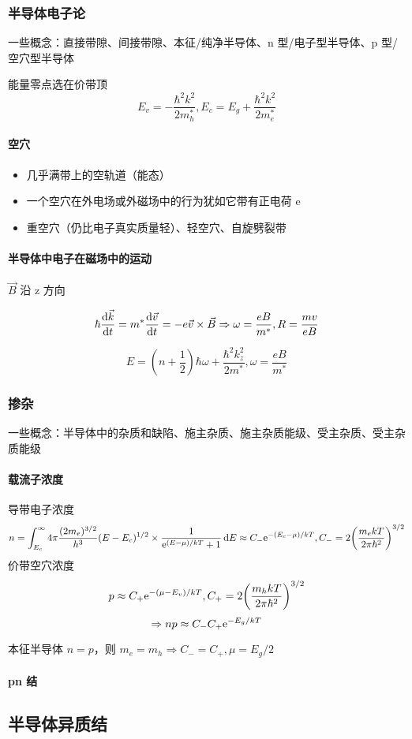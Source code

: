 \subsubsection{半导体电子论}

一些概念：直接带隙、间接带隙、本征/纯净半导体、n 型/电子型半导体、p 型/空穴型半导体

能量零点选在价带顶
\[ E_v = - \frac{\hbar^2 k^2}{2 m_h^*}, E_c = E_g + \frac{\hbar^2 k^2}{2 m_e^*} \]

\paragraph{空穴}

\begin{itemize}
    \item 几乎满带上的空轨道（能态）
    \item 一个空穴在外电场或外磁场中的行为犹如它带有正电荷 e
    \item 重空穴（仍比电子真实质量轻）、轻空穴、自旋劈裂带
\end{itemize}

\paragraph{半导体中电子在磁场中的运动}

$ \vec{B} $ 沿 z 方向

\[ \hbar \dv{\vec{k}}{t} = m^* \dv{\vec{v}}{t} = - e \vec{v} \times \vec{B} \Rightarrow \omega = \frac{e B}{m^*}, R = \frac{m v}{e B} \]

\[ E = (n + \frac{1}{2}) \hbar \omega + \frac{\hbar^2 k_z^2}{2 m^*}, \omega = \frac{e B}{m^*} \]

\subsubsection{掺杂}

一些概念：半导体中的杂质和缺陷、施主杂质、施主杂质能级、受主杂质、受主杂质能级

\paragraph{载流子浓度}

导带电子浓度
\[ n = \int_{E_c}^{\infty} 4 \pi \frac{(2 m_e)^{3/2}}{h^3} (E - E_c)^{1/2} \times \frac{1}{\mathrm{e}^{(E - \mu) / k T} + 1} \dd{E} \approx C_- \mathrm{e}^{- (E_c - \mu) / k T}, C_- = 2 \qty(\frac{m_e k T}{2 \pi \hbar^2})^{3/2} \]
价带空穴浓度
\[ p \approx C_+ \mathrm{e}^{- (\mu - E_v) / k T}, C_+ = 2 \qty(\frac{m_h k T}{2 \pi \hbar^2})^{3/2} \]
\[ \Rightarrow n p \approx C_- C_+ \mathrm{e}^{- E_g / k T} \]

本征半导体 $ n = p $，则 $ m_e = m_h \Rightarrow C_- = C_+, \mu = E_g / 2 $

\paragraph{pn 结}

{\color{gray}
    \subsection{半导体异质结}
}